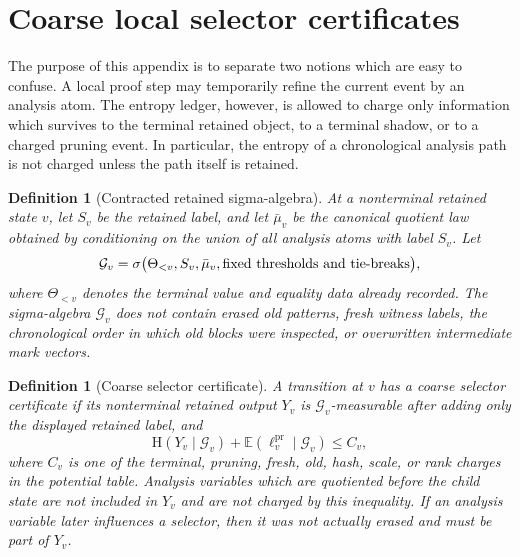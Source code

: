 \documentclass[11pt]{article}
\newtheorem{definition}[theorem]{Definition}
\theoremstyle{remark}
\newcommand{\G}{\mathcal G}
\newcommand{\E}{\mathbb E}
\newcommand{\HH}{\mathrm H}
\newcommand{\pr}{\mathrm{pr}}
\begin{document}
\section{Coarse local selector certificates}

The purpose of this appendix is to separate two notions which are easy to confuse.  A local proof step may temporarily refine the current event by an analysis atom.  The entropy ledger, however, is allowed to charge only information which survives to the terminal retained object, to a terminal shadow, or to a charged pruning event.  In particular, the entropy of a chronological analysis path is not charged unless the path itself is retained.

\begin{definition}[Contracted retained sigma-algebra]\label{def:coarse-filtration}
At a nonterminal retained state $v$, let $S_v$ be the retained label, and let $\bar\mu_v$ be the canonical quotient law obtained by conditioning on the union of all analysis atoms with label $S_v$.  Let
\[
        \G_v=\sigma\bigl(\Theta_{<v},S_v,\bar\mu_v,\hbox{fixed thresholds and tie-breaks}\bigr),
\]
where $\Theta_{<v}$ denotes the terminal value and equality data already recorded.  The sigma-algebra $\G_v$ does not contain erased old patterns, fresh witness labels, the chronological order in which old blocks were inspected, or overwritten intermediate mark vectors.
\end{definition}

\begin{definition}[Coarse selector certificate]\label{def:coarse-certificate}
A transition at $v$ has a coarse selector certificate if its nonterminal retained output $Y_v$ is $\G_v$-measurable after adding only the displayed retained label, and
\[
        \HH(Y_v\mid \G_v) + \E(\ell_v^{\pr}\mid \G_v)
        \le C_v,
\]
where $C_v$ is one of the terminal, pruning, fresh, old, hash, scale, or rank charges in the potential table.  Analysis variables which are quotiented before the child state are not included in $Y_v$ and are not charged by this inequality.  If an analysis variable later influences a selector, then it was not actually erased and must be part of $Y_v$.
\end{definition}
\end{document}
